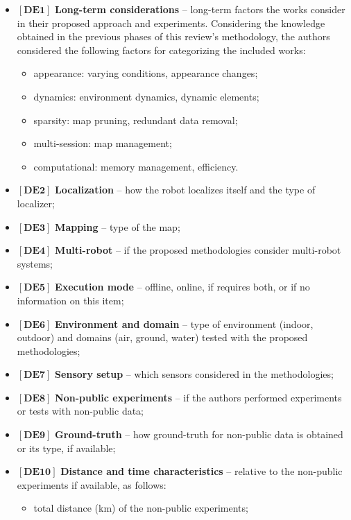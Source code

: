 \begin{itemize}[nosep]
\item $\left[\textbf{DE1}\right]$ \textbf{Long-term considerations} -- long-term factors the works consider in their proposed approach and experiments. Considering the knowledge obtained in the previous phases of this review's methodology, the authors considered the following factors for categorizing the included works:
  \begin{itemize}[nosep]
  \item appearance: varying conditions, appearance changes;
  \item dynamics: environment dynamics, dynamic elements;
  \item sparsity: map pruning, redundant data removal;
  \item multi-session: map management;
  \item computational: memory management, efficiency.
  \end{itemize}
\item $\left[\textbf{DE2}\right]$ \textbf{Localization} -- how the robot localizes itself and the type of localizer;
\item $\left[\textbf{DE3}\right]$ \textbf{Mapping} -- type of the map;
\item $\left[\textbf{DE4}\right]$ \textbf{Multi-robot} -- if the proposed methodologies consider multi-robot systems;
\item $\left[\textbf{DE5}\right]$ \textbf{Execution mode} -- offline, online, if requires both, or if no information on this item;
\item $\left[\textbf{DE6}\right]$ \textbf{Environment and domain} -- type of environment (indoor, outdoor) and domains (air, ground, water) tested with the proposed methodologies;
\item $\left[\textbf{DE7}\right]$ \textbf{Sensory setup} -- which sensors considered in the methodologies;
\item $\left[\textbf{DE8}\right]$ \textbf{Non-public experiments} -- if the authors performed experiments or tests with non-public data;
\item $\left[\textbf{DE9}\right]$ \textbf{Ground-truth} -- how ground-truth for non-public data is obtained or its type, if available;
\item $\left[\textbf{DE10}\right]$ \textbf{Distance and time characteristics} -- relative to the non-public experiments if available, as follows:
  \begin{itemize}[nosep]
  \item total distance (km) of the non-public experiments;

\end{itemize}
\end{itemize}

